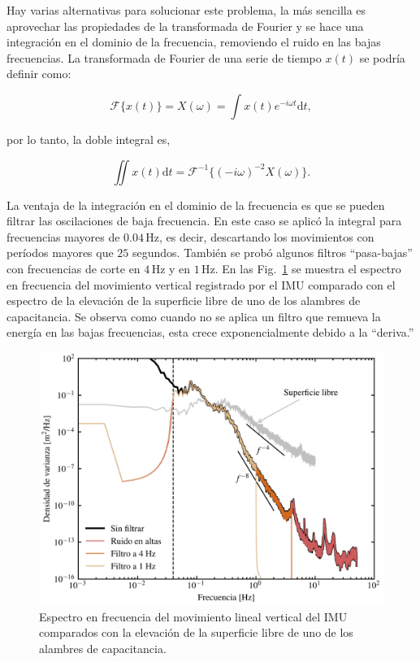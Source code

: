 \documentclass[11pt]{article}
\begin{document}
Hay varias alternativas para solucionar este problema, la más sencilla es
aprovechar las propiedades de la transformada de Fourier y se hace una
integración en el dominio de la frecuencia, removiendo el ruido en las bajas
frecuencias. La transformada de Fourier de una serie de tiempo $x(t)$ se podría
definir como:

\begin{equation}
  \mathcal{F}\{x(t)\} = X(\omega) = \int x(t) e^{-i\omega t} \mathrm{d}t,
\end{equation}

por lo tanto, la doble integral es,

\begin{equation}
  \iint x(t)\mathrm{d}t = \mathcal{F}^{-1} \{(-i\omega)^{-2} X(\omega) \}.
\end{equation}

La ventaja de la integración en el dominio de la frecuencia es que se pueden
filtrar las oscilaciones de baja frecuencia. En este caso se aplicó la integral
para frecuencias mayores de $0.04\,\mathrm{Hz}$, es decir, descartando los
movimientos con períodos mayores que $25$ segundos. También se probó algunos
filtros ``pasa-bajas'' con frecuencias de corte en $4\,\mathrm{Hz}$ y en
$1\,\mathrm{Hz}$. En las Fig.~\ref{fig:motion_spectra} se muestra el espectro en
frecuencia del movimiento vertical registrado por el IMU comparado con el
espectro de la elevación de la superficie libre de uno de los alambres de
capacitancia. Se observa como cuando no se aplica un filtro que remueva la
energía en las bajas frecuencias, esta crece exponencialmente debido a la
``deriva.''

\begin{figure}[htpb]
  \centering
  \includegraphics[width=0.8\linewidth]{./figures/motion_spectra.png}
  \caption{
    Espectro en frecuencia del movimiento lineal vertical del IMU comparados con
    la elevación de la superficie libre de uno de los alambres de capacitancia.
  }
  \label{fig:motion_spectra}
\end{figure}
\end{document}
